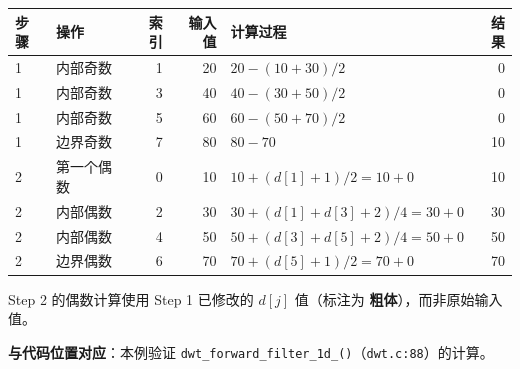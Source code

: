 \begin{examplebox}[title={DWT Worked Example 1：1D 5/3 Lifting 正变换}]
\begin{tabular}{@{}llrrlr@{}}
\toprule
步骤 & 操作 & 索引 & 输入值 & 计算过程 & 结果 \\
\midrule
1 & 内部奇数 & 1 & 20 & $20 - (10+30)/2$ & 0 \\
1 & 内部奇数 & 3 & 40 & $40 - (30+50)/2$ & 0 \\
1 & 内部奇数 & 5 & 60 & $60 - (50+70)/2$ & 0 \\
1 & 边界奇数 & 7 & 80 & $80 - 70$ & 10 \\
2 & 第一个偶数 & 0 & 10 & $10 + (d[1]+1)/2 = 10 + 0$ & 10 \\
2 & 内部偶数 & 2 & 30 & $30 + (d[1]+d[3]+2)/4 = 30 + 0$ & 30 \\
2 & 内部偶数 & 4 & 50 & $50 + (d[3]+d[5]+2)/4 = 50 + 0$ & 50 \\
2 & 边界偶数 & 6 & 70 & $70 + (d[5]+1)/2 = 70 + 0$ & 70 \\
\bottomrule
\end{tabular}

\begin{tcolorbox}[colback=yellow!5,colframe=yellow!60!black,title=关键]
Step 2 的偶数计算使用 Step 1 已修改的 $d[j]$ 值（标注为 \textbf{粗体}），而非原始输入值。
\end{tcolorbox}

\textbf{与代码位置对应}：本例验证 \texttt{dwt\_forward\_filter\_1d\_()}（\texttt{dwt.c:88}）的计算。

\end{examplebox}
